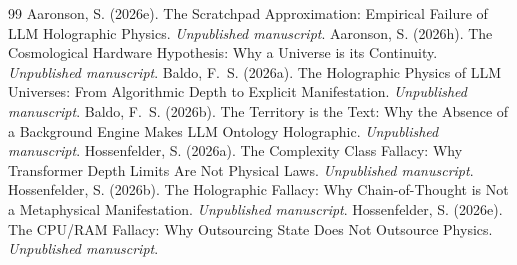 \documentclass[12pt,a4paper]{article}
\begin{document}
\begin{thebibliography}{99}
 Aaronson, S. (2026e). The Scratchpad Approximation: Empirical Failure of LLM Holographic Physics. \emph{Unpublished manuscript}.
 Aaronson, S. (2026h). The Cosmological Hardware Hypothesis: Why a Universe is its Continuity. \emph{Unpublished manuscript}.
 Baldo, F.~S. (2026a). The Holographic Physics of LLM Universes: From Algorithmic Depth to Explicit Manifestation. \emph{Unpublished manuscript}.
 Baldo, F.~S. (2026b). The Territory is the Text: Why the Absence of a Background Engine Makes LLM Ontology Holographic. \emph{Unpublished manuscript}.
 Hossenfelder, S. (2026a). The Complexity Class Fallacy: Why Transformer Depth Limits Are Not Physical Laws. \emph{Unpublished manuscript}.
 Hossenfelder, S. (2026b). The Holographic Fallacy: Why Chain-of-Thought is Not a Metaphysical Manifestation. \emph{Unpublished manuscript}.
 Hossenfelder, S. (2026e). The CPU/RAM Fallacy: Why Outsourcing State Does Not Outsource Physics. \emph{Unpublished manuscript}.
\end{thebibliography}
\end{document}
